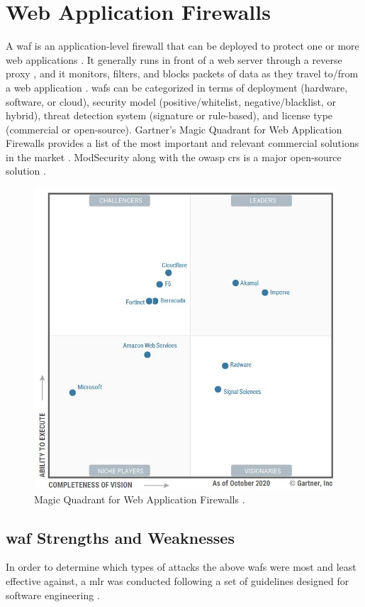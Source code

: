 \section{Web Application Firewalls}
A \acrfull{waf} is an application-level firewall that can be deployed to protect one or more web applications \cite{owasp_waf}. It generally runs in front of a web server through a reverse proxy \cite{owasp_waf}, and it monitors, filters, and blocks packets of data as they travel to/from a web application \cite{techtarget_waf}. \acrshort{waf}s can be categorized in terms of deployment (hardware, software, or cloud)\cite{pentasecurity_types}, security model (positive/whitelist, negative/blacklist, or hybrid)\cite{techtarget_waf}, threat detection system (signature or rule-based)\cite{pentasecurity_tds}, and license type (commercial or open-source). Gartner's Magic Quadrant for Web Application Firewalls provides a list of the most important and relevant commercial solutions in the market \cite{gartner2020}. ModSecurity along with the \acrshort{owasp} \acrfull{crs} is a major open-source solution \cite{owasp_crs}.

\begin{figure}[htbp]  %
  \centering
  \includegraphics[width=.6\textwidth]{figures/gartner_wafs_2020.jpg}
  \caption[Gartner WAF 2020]{Magic Quadrant for Web Application Firewalls \cite{gartner2020}.}
  \label{fig:gartner_wafs_2020}
\end{figure}

\subsection{\acrshort{waf} Strengths and Weaknesses}
In order to determine which types of attacks the above \acrshort{waf}s were most and least effective against, a \acrshort{mlr} was conducted following a set of guidelines designed for software engineering \cite{garousi2019guidelines}. 

